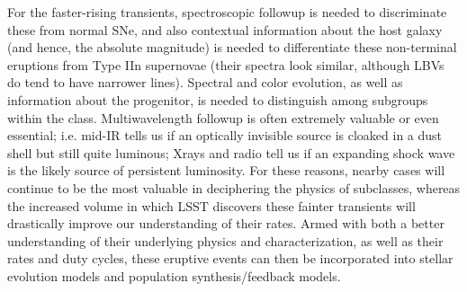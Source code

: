 For the faster-rising transients, spectroscopic followup is needed to
discriminate these from normal SNe, and also contextual information
about the host galaxy (and hence, the absolute magnitude) is needed to
differentiate these non-terminal eruptions from Type IIn supernovae
(their spectra look similar, although LBVs do tend to have narrower
lines).  Spectral and color evolution, as well as information about
the progenitor, is needed to distinguish among subgroups within the
class.  Multiwavelength followup is often extremely valuable or even
essential; i.e. mid-IR tells us if an optically invisible source is
cloaked in a dust shell but still quite luminous; Xrays and radio tell
us if an expanding shock wave is the likely source of persistent
luminosity.  For these reasons, nearby cases will continue to be the
most valuable in deciphering the physics of subclasses, whereas the
increased volume in which LSST discovers these fainter transients will
drastically improve our understanding of their rates.  Armed with both
a better understanding of their underlying physics and
characterization, as well as their rates and duty cycles, these
eruptive events can then be incorporated into stellar evolution models
and population synthesis/feedback models.

